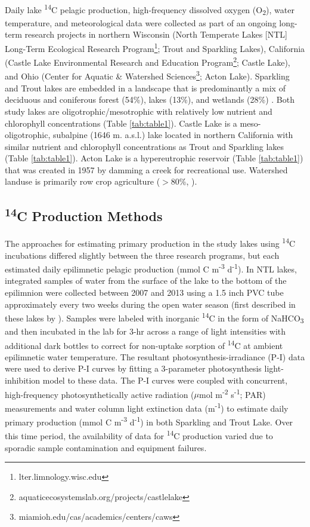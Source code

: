 \documentclass[12pt, oneside]{article}
\begin{document}
Daily lake \textsuperscript{14}C pelagic production, high-frequency dissolved oxygen (O\textsubscript{2}), water temperature, and meteorological data were collected as part of an ongoing long-term research projects in northern Wisconsin (North Temperate Lakes [NTL] Long-Term Ecological Research Program\footnote{lter.limnology.wisc.edu}; Trout and Sparkling Lakes), California (Castle Lake Environmental Research and Education Program\footnote{aquaticecosystemslab.org/projects/castlelake}; Castle Lake), and Ohio (Center for Aquatic \& Watershed Sciences\footnote{miamioh.edu/cas/academics/centers/caws}; Acton Lake). Sparkling and Trout lakes are embedded in a landscape that is predominantly a mix of deciduous and coniferous forest (54\%), lakes (13\%), and wetlands (28\%) \cite{magnuson_long-term_2006}. Both study lakes are oligotrophic/mesotrophic with relatively low nutrient and chlorophyll concentrations (Table \ref{tab:table1}). Castle Lake is a meso-oligotrophic, subalpine (1646 m. a.s.l.) lake \citep{VanderZanden_Chandra_Park_Vadeboncoeur_Goldman_2006} located in northern California with similar nutrient and chlorophyll concentrations as Trout and Sparkling lakes (Table \ref{tab:table1}). Acton Lake is a hypereutrophic reservoir (Table \ref{tab:table1}) that was created in 1957 by damming a creek for recreational use. Watershed landuse is primarily row crop agriculture ($>$80\%, \citealt{vanni_dissolved_2001}).

\subsection*{\textsuperscript{14}C Production Methods} %

The approaches for estimating primary production in the study lakes using \textsuperscript{14}C incubations differed slightly between the three research programs, but each estimated daily epilimnetic pelagic production (mmol C m\textsuperscript{-3} d\textsuperscript{-1}). In NTL lakes, integrated samples of water from the surface of the lake to the bottom of the epilimnion were collected between 2007 and 2013 using a 1.5 inch PVC tube approximately every two weeks during the open water season (first described in these lakes by \citealt{adams_primary_1993}). Samples were labeled with inorganic \textsuperscript{14}C in the form of NaHCO\textsubscript{3} and then incubated in the lab for 3-hr across a range of light intensities with additional dark bottles to correct for non-uptake sorption of \textsuperscript{14}C at ambient epilimnetic water temperature. The resultant photosynthesis-irradiance (P-I) data were used to derive P-I curves by fitting a 3-parameter photosynthesis light-inhibition model \citep{Platt_Gallegos_Harrison_1980} to these data. The P-I curves were coupled with concurrent, high-frequency photosynthetically active radiation ($\mu$mol m\textsuperscript{-2} s\textsuperscript{-1}; PAR) measurements and water column light extinction data (m\textsuperscript{-1}) to estimate daily primary production (mmol C m\textsuperscript{-3} d\textsuperscript{-1}) in both Sparkling and Trout Lake. Over this time period, the availability of data for \textsuperscript{14}C production varied due to sporadic sample contamination and equipment failures.
\end{document}
